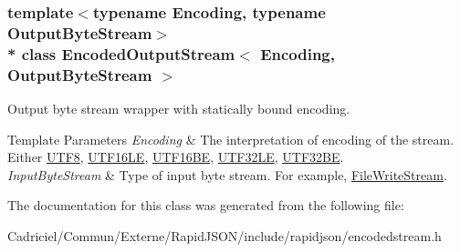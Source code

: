 \subsubsection*{template$<$typename Encoding, typename Output\+Byte\+Stream$>$\\*
class Encoded\+Output\+Stream$<$ Encoding, Output\+Byte\+Stream $>$}

Output byte stream wrapper with statically bound encoding. 


\begin{DoxyTemplParams}{Template Parameters}
{\em Encoding} & The interpretation of encoding of the stream. Either \hyperlink{struct_u_t_f8}{U\+T\+F8}, \hyperlink{struct_u_t_f16_l_e}{U\+T\+F16\+LE}, \hyperlink{struct_u_t_f16_b_e}{U\+T\+F16\+BE}, \hyperlink{struct_u_t_f32_l_e}{U\+T\+F32\+LE}, \hyperlink{struct_u_t_f32_b_e}{U\+T\+F32\+BE}. \\
\hline
{\em Input\+Byte\+Stream} & Type of input byte stream. For example, \hyperlink{class_file_write_stream}{File\+Write\+Stream}. \\
\hline
\end{DoxyTemplParams}


The documentation for this class was generated from the following file\+:\begin{DoxyCompactItemize}
\item 
Cadriciel/\+Commun/\+Externe/\+Rapid\+J\+S\+O\+N/include/rapidjson/encodedstream.\+h\end{DoxyCompactItemize}
